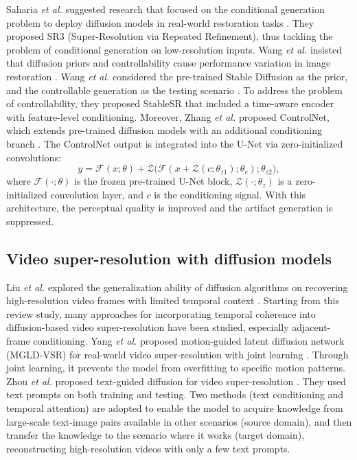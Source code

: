 Saharia \emph{et al.} suggested research that focused on the 
conditional generation problem to deploy diffusion models in 
real-world restoration tasks \cite{saharia2022sr3}. They 
proposed SR3 (Super-Resolution via Repeated Refinement), thus 
tackling the problem of conditional generation on low-resolution 
inputs. Wang \emph{et al.} insisted that diffusion priors and 
controllability cause performance variation in image restoration 
\cite{wang2024exploiting}. Wang \emph{et al.} considered the 
pre-trained Stable Diffusion as the prior, and the controllable 
generation as the testing scenario \cite{wang2024exploiting}. 
To address the problem of controllability, they proposed 
StableSR that included a time-aware encoder with feature-level 
conditioning. Moreover, Zhang \emph{et al.} proposed ControlNet, 
which extends pre-trained diffusion models with an additional 
conditioning branch \cite{zhang2023controlnet}. The ControlNet 
output is integrated into the U-Net via zero-initialized 
convolutions:
\begin{equation}
    y = \mathcal{F}(x; \theta) + 
    \mathcal{Z}\big(\mathcal{F}(x + \mathcal{Z}(c; \theta_{z1}); 
    \theta_c); \theta_{z2}\big),
    \label{eq:controlnet}
\end{equation}
where $\mathcal{F}(\cdot; \theta)$ is the frozen pre-trained 
U-Net block, $\mathcal{Z}(\cdot; \theta_z)$ is a 
zero-initialized convolution layer, and $c$ is the conditioning 
signal. With this architecture, the perceptual quality is 
improved and the artifact generation is suppressed.


\subsection{Video super-resolution with diffusion models}

Liu \emph{et al.} explored the generalization ability of 
diffusion algorithms on recovering high-resolution video frames 
with limited temporal context \cite{liu2024videosr}. Starting 
from this review study, many approaches for incorporating 
temporal coherence into diffusion-based video super-resolution 
have been studied, especially adjacent-frame conditioning. Yang 
\emph{et al.} proposed motion-guided latent diffusion network 
(MGLD-VSR) for real-world video super-resolution with joint 
learning \cite{yang2023motion}. Through joint learning, it 
prevents the model from overfitting to specific motion patterns. 
Zhou \emph{et al.} proposed text-guided diffusion for video 
super-resolution \cite{zhou2024upscale}. They used text prompts 
on both training and testing. Two methods (text conditioning 
and temporal attention) are adopted to enable the model to 
acquire knowledge from large-scale text-image pairs available 
in other scenarios (source domain), and then transfer the 
knowledge to the scenario where it works (target domain), 
reconstructing high-resolution videos with only a few text 
prompts.

